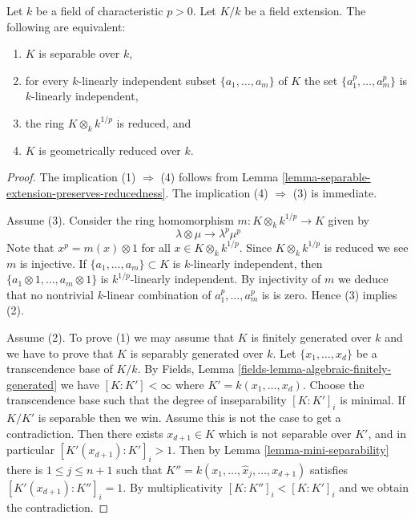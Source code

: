 \begin{lemma}
\label{lemma-characterize-separable-field-extensions}
Let $k$ be a field of characteristic $p > 0$.
Let $K/k$ be a field extension.
The following are equivalent:
\begin{enumerate}
\item $K$ is separable over $k$,
\item for every $k$-linearly independent subset $\{a_1, \ldots, a_m\}$
of $K$ the set $\{a^p_1, \ldots, a_m^p\}$ is $k$-linearly independent,
\item the ring $K \otimes_k k^{1/p}$ is reduced, and
\item $K$ is geometrically reduced over $k$.
\end{enumerate}
\end{lemma}

\begin{proof}
The implication (1) $\Rightarrow$ (4) follows from
Lemma \ref{lemma-separable-extension-preserves-reducedness}.
The implication (4) $\Rightarrow$ (3) is immediate.

\medskip\noindent
Assume (3). Consider the ring homomorphism
$m : K \otimes_k k^{1/p} \rightarrow K$ given by 
$$
\lambda \otimes \mu \rightarrow \lambda^p \mu^p
$$
Note that $x^p = m(x) \otimes 1$ for all $x \in K \otimes_k k^{1/p}$.
Since $K \otimes_k k^{1/p}$ is reduced
we see $m$ is injective. If $\{a_1, \ldots, a_m\} \subset K$
is $k$-linearly independent, then $\{a_1 \otimes 1, \ldots, a_m \otimes 1\}$
is $k^{1/p}$-linearly independent. By injectivity of $m$ we deduce
that no nontrivial $k$-linear combination of $a_1^p, \ldots, a_m^p$ is
is zero. Hence (3) implies (2).

\medskip\noindent
Assume (2). To prove (1) we may assume that $K$ is finitely generated over $k$
and we have to prove that $K$ is separably generated over $k$.
Let $\{x_1, \ldots, x_d\}$ be a transcendence base of $K/k$. By
Fields, Lemma \ref{fields-lemma-algebraic-finitely-generated}
we have $[K : K'] < \infty$ where $K' = k(x_1, \ldots, x_d)$.
Choose the transcendence base such that the degree of inseparability
$[K : K']_i$ is minimal. If $K / K'$ is separable then we win.
Assume this is not the case to get a contradiction. Then there exists
$x_{d + 1} \in K$ which is not separable over $K'$, and in particular
$[K'(x_{d+1}) : K']_i > 1$. Then by
Lemma \ref{lemma-mini-separability} there is $1 \leq j \leq n + 1$
such that $K'' = k(x_1, \ldots, \widehat{x}_j, \ldots, x_{d+1})$
satisfies $[K'(x_{d+1}) : K'']_i = 1$. By multiplicativity
$[K : K'']_i < [K : K']_i$ and we obtain the contradiction.
\end{proof}